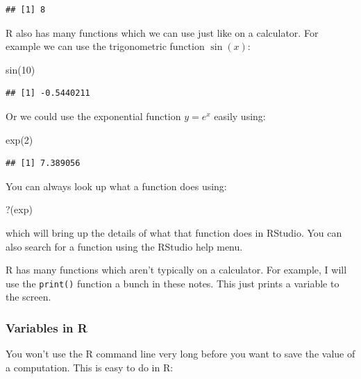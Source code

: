 \documentclass[
]{book}
\newenvironment{Shaded}{\begin{snugshade}}{\end{snugshade}}
\newcommand{\AttributeTok}[1]{\textcolor[rgb]{0.77,0.63,0.00}{#1}}
\newcommand{\DecValTok}[1]{\textcolor[rgb]{0.00,0.00,0.81}{#1}}
\newcommand{\FunctionTok}[1]{\textcolor[rgb]{0.00,0.00,0.00}{#1}}
\newcommand{\NormalTok}[1]{#1}
\newcommand{\StringTok}[1]{\textcolor[rgb]{0.31,0.60,0.02}{#1}}
\theoremstyle{definition}
\theoremstyle{definition}
\theoremstyle{definition}
\theoremstyle{definition}
\theoremstyle{remark}
\begin{document}
\begin{verbatim}
## [1] 8
\end{verbatim}

R also has many functions which we can use just like on a calculator. For example we can use the trigonometric function \(\sin(x)\):

\begin{Shaded}
\begin{Highlighting}[]
\FunctionTok{sin}\NormalTok{(}\DecValTok{10}\NormalTok{)}
\end{Highlighting}
\end{Shaded}

\begin{verbatim}
## [1] -0.5440211
\end{verbatim}

Or we could use the exponential function \(y=e^x\) easily using:

\begin{Shaded}
\begin{Highlighting}[]
\FunctionTok{exp}\NormalTok{(}\DecValTok{2}\NormalTok{)}
\end{Highlighting}
\end{Shaded}

\begin{verbatim}
## [1] 7.389056
\end{verbatim}

You can always look up what a function does using:

\begin{Shaded}
\begin{Highlighting}[]
\StringTok{\textasciigrave{}}\AttributeTok{?}\StringTok{\textasciigrave{}}\NormalTok{(exp)}
\end{Highlighting}
\end{Shaded}

which will bring up the details of what that function does in RStudio. You can also search for a function using the RStudio help menu.

R has many functions which aren't typically on a calculator. For example, I will use the \texttt{print()} function a bunch in these notes. This just prints a variable to the screen.

\hypertarget{variables-in-r}{%
\subsubsection{Variables in R}\label{variables-in-r}}

You won't use the R command line very long before you want to save the value of a computation. This is easy to do in R:
\end{document}

